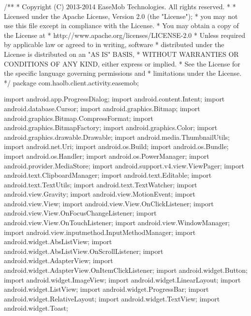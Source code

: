 /**
 * Copyright (C) 2013-2014 EaseMob Technologies. All rights reserved.
 *
 * Licensed under the Apache License, Version 2.0 (the "License");
 * you may not use this file except in compliance with the License.
 * You may obtain a copy of the License at
 *     http://www.apache.org/licenses/LICENSE-2.0
 * Unless required by applicable law or agreed to in writing, software
 * distributed under the License is distributed on an "AS IS" BASIS,
 * WITHOUT WARRANTIES OR CONDITIONS OF ANY KIND, either express or implied.
 * See the License for the specific language governing permissions and
 * limitations under the License.
 */
package com.haolb.client.activity.easemob;

import android.app.ProgressDialog;
import android.content.Intent;
import android.database.Cursor;
import android.graphics.Bitmap;
import android.graphics.Bitmap.CompressFormat;
import android.graphics.BitmapFactory;
import android.graphics.Color;
import android.graphics.drawable.Drawable;
import android.media.ThumbnailUtils;
import android.net.Uri;
import android.os.Build;
import android.os.Bundle;
import android.os.Handler;
import android.os.PowerManager;
import android.provider.MediaStore;
import android.support.v4.view.ViewPager;
import android.text.ClipboardManager;
import android.text.Editable;
import android.text.TextUtils;
import android.text.TextWatcher;
import android.view.Gravity;
import android.view.MotionEvent;
import android.view.View;
import android.view.View.OnClickListener;
import android.view.View.OnFocusChangeListener;
import android.view.View.OnTouchListener;
import android.view.WindowManager;
import android.view.inputmethod.InputMethodManager;
import android.widget.AbsListView;
import android.widget.AbsListView.OnScrollListener;
import android.widget.AdapterView;
import android.widget.AdapterView.OnItemClickListener;
import android.widget.Button;
import android.widget.ImageView;
import android.widget.LinearLayout;
import android.widget.ListView;
import android.widget.ProgressBar;
import android.widget.RelativeLayout;
import android.widget.TextView;
import android.widget.Toast;

